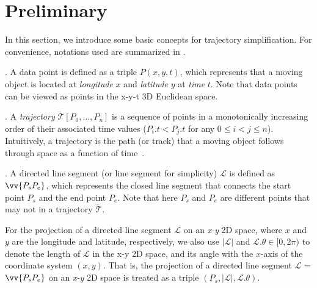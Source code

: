 \section{Preliminary}	%
\label{sec-problem}


In this section, we introduce some basic concepts for trajectory simplification.
For convenience, notations used are summarized in .

. A data point is defined as a triple $P(x, y, t)$, which represents that a moving object is located at {\em longitude} $x$ and {\em latitude} $y$ at {\em time} $t$. Note that data points can be viewed as points in the x-y-t 3D Euclidean space.

. A \textit{trajectory} $\dddot{\mathcal{T}}\left[P_0, \ldots, P_n\right]$ is a sequence of points in a monotonically increasing order of their associated time values (\ie $P_i.t < P_j.t$ for any $0\le i<j\le n$). %
Intuitively, a trajectory is the path (or track) that a moving object follows through space as a function of time~\cite{physics-trajectory}.

. A directed line segment (or line segment for simplicity) $\mathcal{L}$ is defined as $\vv{P_{s}P_{e}}$, which represents the closed line segment that connects the start point $P_s$ and the end point $P_e$.
Note that here $P_s$ and $P_e$ are different points that may not in a trajectory $\dddot{\mathcal{T}}$.


For the projection of a directed line segment $\mathcal{L}$ on an \emph{x-y} 2D space, where $x$ and $y$ are the longitude and latitude, respectively, we also use $|\mathcal{L}|$ and $\mathcal{L}.\theta\in [0, 2\pi)$ to denote the length of $\mathcal{L}$ in the x-y 2D space, and its angle with the $x$-axis of the coordinate system $(x, y)$.  That is, the projection of a directed line segment $\mathcal{L}$ = $\vv{P_{s}P_{e}}$ on an \emph{x-y} 2D space is treated as a triple $(P_s, |\mathcal{L}|, \mathcal{L}.\theta)$.



